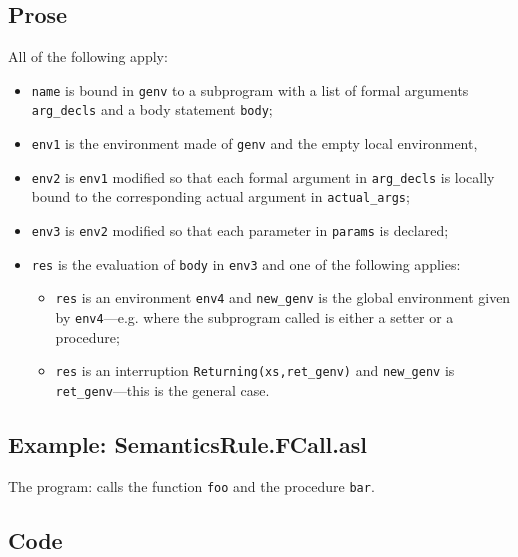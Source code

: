 \documentclass{book}
\begin{document}
  \subsection{Prose}
  All of the following apply:
  \begin{itemize}
  \item \texttt{name} is bound in \texttt{genv} to a subprogram with a list of formal arguments
    \texttt{arg\_decls} and a body statement \texttt{body};
  \item \texttt{env1} is the environment made of \texttt{genv} and the empty local environment,
  \item \texttt{env2} is \texttt{env1} modified so that each formal argument in \texttt{arg\_decls} is
    locally bound to the corresponding actual argument in \texttt{actual\_args};
  \item \texttt{env3} is \texttt{env2} modified so that each parameter in \texttt{params} is declared;
  \item \texttt{res} is the evaluation of \texttt{body} in \texttt{env3} and one of the following
    applies:
      \begin{itemize}
      \item \texttt{res} is an environment \texttt{env4} and \texttt{new\_genv} is the global environment
        given by \texttt{env4}---e.g. where the subprogram called is either a setter or
        a procedure;
      \item \texttt{res} is an interruption \texttt{Returning(xs,ret\_genv)} and \texttt{new\_genv} is
        \texttt{ret\_genv}---this is the general case.
      \end{itemize}
  \end{itemize}

  \subsection{Example: SemanticsRule.FCall.asl}
  The program:
  calls the function \texttt{foo} and the procedure \texttt{bar}.

  \subsection{Code}
\end{document}

